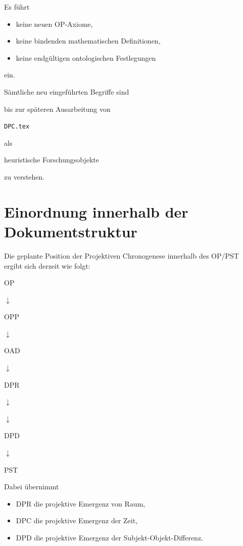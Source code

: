 \documentclass[11pt,a4paper]{article}
\begin{document}
Es führt

\begin{itemize}

\item keine neuen OP-Axiome,

\item keine bindenden mathematischen Definitionen,

\item keine endgültigen ontologischen Festlegungen

\end{itemize}

ein.

Sämtliche neu eingeführten Begriffe sind

bis zur späteren Ausarbeitung von

\texttt{DPC.tex}

als

heuristische Forschungsobjekte

zu verstehen.

\section{Einordnung innerhalb der Dokumentstruktur}

Die geplante Position der Projektiven Chronogenese
innerhalb des OP/PST ergibt sich derzeit wie folgt:

\bigskip

\begin{center}

OP

$\downarrow$

OPP

$\downarrow$

OAD

$\downarrow$

DPR

$\downarrow$


$\downarrow$

DPD

$\downarrow$

PST

\end{center}

\bigskip

Dabei übernimmt

\begin{itemize}

\item DPR die projektive Emergenz von Raum,

\item DPC die projektive Emergenz der Zeit,

\item DPD die projektive Emergenz der
Subjekt-Objekt-Differenz.

\end{itemize}
\end{document}
